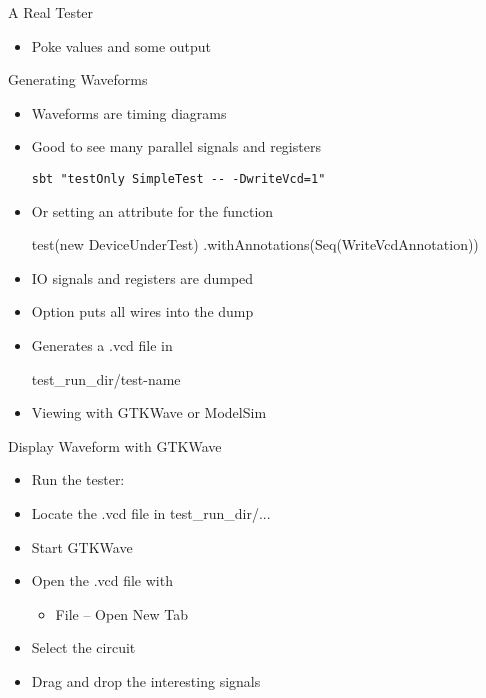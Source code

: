 \begin{frame}[fragile]{A Real Tester}
\begin{itemize}
\item Poke values and  some output
\end{itemize}
\end{frame}



\begin{frame}[fragile]{Generating Waveforms}
\begin{itemize}
\item Waveforms are timing diagrams
\item Good to see many parallel signals and registers
\begin{verbatim}
sbt "testOnly SimpleTest -- -DwriteVcd=1"
\end{verbatim}
\item Or setting an attribute for the  function
\begin{chisel}
test(new DeviceUnderTest)
    .withAnnotations(Seq(WriteVcdAnnotation))
\end{chisel}
\item IO signals and registers are dumped
\item Option  puts all wires into the dump
\item Generates a .vcd file in
\begin{chisel}
    test_run_dir/test-name
\end{chisel}
\item Viewing with GTKWave or ModelSim
\end{itemize}
\end{frame}

\begin{frame}[fragile]{Display Waveform with GTKWave}
\begin{itemize}
\item Run the tester: 
\item Locate the .vcd file in test\_run\_dir/...
\item Start GTKWave
\item Open the .vcd file with
\begin{itemize}
\item File -- Open New Tab
\end{itemize}
\item Select the circuit
\item Drag and drop the interesting signals
\end{itemize}
\end{frame}

